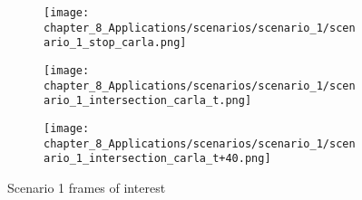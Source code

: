 \begin{figure}[]
	\begin{subfigure}[b]{0.48\textwidth}
		\centering
		\texttt{[image: chapter\_8\_Applications/scenarios/scenario\_1/scenario\_1\_stop\_carla.png]}
		\caption{}
		\label{subfig:chapter_8_Applications/scenarios/scenario_1/scenario_1_stop_carla}
	\end{subfigure}
	\hfill
	\begin{subfigure}[b]{0.48\textwidth}
		\centering
		\caption{}
		\label{subfig:chapter_8_Applications/scenarios/scenario_1/scenario_1_stop_rviz}
	\end{subfigure}
	\tabularnewline
	\begin{subfigure}[b]{0.48\textwidth}
		\centering
		\texttt{[image: chapter\_8\_Applications/scenarios/scenario\_1/scenario\_1\_intersection\_carla\_t.png]}
		\caption{}
		\label{subfig:chapter_8_Applications/scenarios/scenario_1/scenario_1_intersection_carla_t}
	\end{subfigure}
	\hfill
	\begin{subfigure}[b]{0.48\textwidth}
		\centering
		\caption{}
		\label{subfig:chapter_8_Applications/scenarios/scenario_1/scenario_1_intersection_rviz_t}
	\end{subfigure}
	\tabularnewline
	\begin{subfigure}[b]{0.48\textwidth}
		\centering
		\texttt{[image: chapter\_8\_Applications/scenarios/scenario\_1/scenario\_1\_intersection\_carla\_t+40.png]}
		\caption{}
		\label{subfig:chapter_8_Applications/scenarios/scenario_1/scenario_1_intersection_carla_t+40}
	\end{subfigure}
	\hfill
	\begin{subfigure}[b]{0.48\textwidth}
		\centering
		\caption{}
		\label{subfig:chapter_8_Applications/scenarios/scenario_1/scenario_1_intersection_rviz_t+40}
	\end{subfigure}
	\tabularnewline
	\caption{Scenario 1 frames of interest}
	\label{fig:chapter_8_Applications/scenarios/scenario_1_frames_of_interest}
\end{figure}

